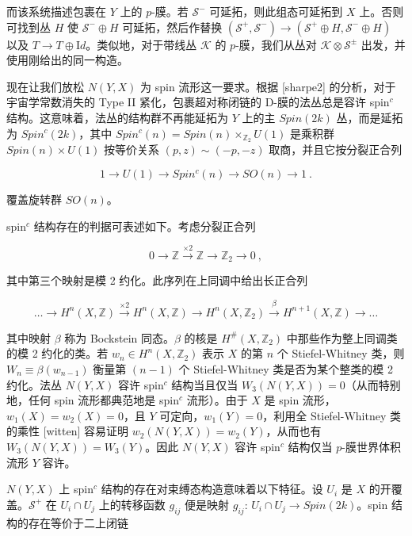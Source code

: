 \documentclass[11pt,a4paper]{ctexart}
\begin{document}
而该系统描述包裹在 \(Y\) 上的 \(p\)-膜。若 \({\mathcal S}^-\) 可延拓，则此组态可延拓到 \(X\) 上。否则可找到丛 \(H\) 使 \({\mathcal S}^-\oplus H\) 可延拓，然后作替换 \(({\mathcal S}^+,{\mathcal S}^-)\rightarrow({\mathcal S}^+\oplus H,{\mathcal S}^-\oplus H)\) 以及 \(T\rightarrow T\oplus{\mathrm Id}\)。类似地，对于带线丛 \({\mathcal K}\) 的 \(p\)-膜，我们从丛对 \({\mathcal K}\otimes{\mathcal S}^{\pm}\) 出发，并使用刚给出的同一构造。

现在让我们放松 \(N(Y,X)\) 为 spin 流形这一要求。根据 [sharpe2] 的分析，对于宇宙学常数消失的 Type II 紧化，包裹超对称闭链的 D-膜的法丛总是容许 spin\(^c\) 结构。这意味着，法丛的结构群不再能延拓为 \(Y\) 上的主 \(Spin(2k)\) 丛，而是延拓为 \(Spin^c(2k)\)，其中 \(Spin^c(n)=Spin(n)\times_{{\mathbb{Z}}_2}U(1)\) 是乘积群 \(Spin(n)\times U(1)\) 按等价关系 \((p,z)\sim(-p,-z)\) 取商，并且它按分裂正合列

\[1\longrightarrow U(1)\longrightarrow Spin^c(n)\longrightarrow SO(n)
\longrightarrow1 \ .\]

覆盖旋转群 \(SO(n)\)。

spin\(^c\) 结构存在的判据可表述如下。考虑分裂正合列

\[0\longrightarrow{\mathbb{Z}}\stackrel{\times2}{\longrightarrow}{\mathbb{Z}}\longrightarrow
{\mathbb{Z}}_2\longrightarrow 0\ ,\]

其中第三个映射是模 2 约化。此序列在上同调中给出长正合列

\[\ldots\longrightarrow H^n(X,{\mathbb{Z}})\stackrel{\times2}{\longrightarrow}
H^n(X,{\mathbb{Z}})\longrightarrow H^n(X,{\mathbb{Z}}_2)\stackrel{\beta}{\longrightarrow}
H^{n+1}(X,{\mathbb{Z}})\longrightarrow\ldots\]

其中映射 \(\beta\) 称为 Bockstein 同态。\(\beta\) 的核是 \(H^\#(X,{\mathbb{Z}}_2)\) 中那些作为整上同调类的模 2 约化的类。若 \(w_n\in H^n(X,{\mathbb{Z}}_2)\) 表示 \(X\) 的第 \(n\) 个 Stiefel-Whitney 类，则 \(W_n\equiv\beta(w_{n-1})\) 衡量第 \((n-1)\) 个 Stiefel-Whitney 类是否为某个整类的模 2 约化。法丛 \(N(Y,X)\) 容许 spin\(^c\) 结构当且仅当 \(W_3(N(Y,X))=0\)（从而特别地，任何 spin 流形都典范地是 spin\(^c\) 流形）。由于 \(X\) 是 spin 流形，\(w_1(X)=w_2(X)=0\)，且 \(Y\) 可定向，\(w_1(Y)=0\)，利用全 Stiefel-Whitney 类的乘性 [witten] 容易证明 \(w_2(N(Y,X))=w_2(Y)\)，从而也有 \(W_3(N(Y,X))=W_3(Y)\)。因此 \(N(Y,X)\) 容许 spin\(^c\) 结构仅当 \(p\)-膜世界体积流形 \(Y\) 容许。

\(N(Y,X)\) 上 spin\(^c\) 结构的存在对束缚态构造意味着以下特征。设 \(U_i\) 是 \(X\) 的开覆盖。\({\mathcal S}^+\) 在 \(U_i\cap U_j\) 上的转移函数 \(g_{ij}\) 便是映射 \(g_{ij}:\, U_i\cap U_j\rightarrow Spin(2k)\)。spin 结构的存在等价于二上闭链
\end{document}
